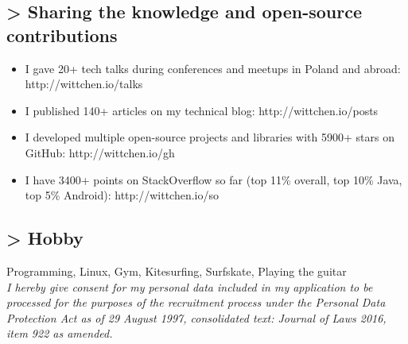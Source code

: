 \documentclass[8pt]{extarticle}
\begin{document}
    \subsection*{\normalsize{> Sharing the knowledge and open-source contributions}}
    \begin{itemize}
      \item I gave 20+ tech talks during conferences and meetups in Poland and abroad: http://wittchen.io/talks
      \item I published 140+ articles on my technical blog: http://wittchen.io/posts
      \item I developed multiple open-source projects and libraries with 5900+ stars on GitHub: http://wittchen.io/gh
      \item I have 3400+ points on StackOverflow so far (top 11\% overall, top 10\% Java, top 5\% Android): http://wittchen.io/so
    \end{itemize}

    \subsection*{\normalsize{> Hobby}}
    Programming, Linux, Gym, Kitesurfing, Surfskate, Playing the guitar\\

    \textit{
    I hereby give consent for my personal data included in my application
    to be processed for the purposes of the recruitment process
    under the Personal Data Protection Act as of 29 August 1997,
    consolidated text: Journal of Laws 2016, item 922 as amended.
    }
\end{document}
